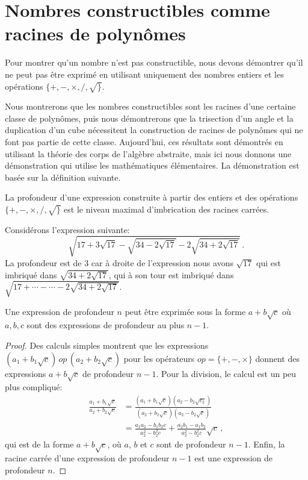 \section{Nombres constructibles comme racines de polynômes}\label{s.trisect-poly}
Pour montrer qu'un nombre n'est pas constructible, nous devons démontrer qu'il ne peut pas être exprimé en utilisant uniquement des nombres entiers et les opérations $\{+,-,\times,/,\surd\}$.

Nous montrerons que les nombres constructibles sont les racines d'une certaine classe de polynômes, puis nous démontrerons que la trisection d'un angle et la duplication d'un cube nécessitent la construction de racines de polynômes qui ne font pas partie de cette classe. Aujourd'hui, ces résultats sont démontrés en utilisant la théorie des corps de l'algèbre abstraite, mais ici nous donnons une démonstration qui utilise les mathématiques élémentaires. La démonstration est basée sur la définition suivante.

\begin{definition}
La profondeur d'une expression construite à partir des entiers et des opérations $\{+,-,\times,/,\surd\}$ est le niveau maximal d'imbrication des racines carrées.
\end{definition}

\begin{example}
Considérons l'expression suivante:
\[
\sqrt{17+3\sqrt{17} - \sqrt{34-2\sqrt{17}}
  -2\sqrt{34+2\sqrt{17}} }\,.
\]
La profondeur est de $3$ car à droite de l'expression nous avons $\sqrt{17}$ qui est imbriqué dans $\sqrt{34+2\sqrt{17}}$, qui à son tour est imbriqué dans  $\sqrt{17+\cdots-\cdots-2\sqrt{34+2\sqrt{17}}}$.
\end{example}

\begin{theorem}
Une expression de profondeur $n$ peut être exprimée sous la forme $a+b\sqrt{c}$ où $a,b,c$ sont des expressions de profondeur au plus $n-1$.
\end{theorem}
\begin{proof}
Des calculs simples montrent que les expressions $(a_1+b_1\sqrt{c})\,\mathit{op}\,(a_2+b_2\sqrt{c})$ pour les opérateurs $\mathit{op}=\{+,-,\times\}$ donnent des expressions $a+b\sqrt{c}$ de profondeur $n-1$. Pour la division, le calcul est un peu plus compliqué:
\begin{align*}
\frac{a_1+b_1\sqrt{c}}{a_2+b_2\sqrt{c}}&=
\frac{(a_1+b_1\sqrt{c})(a_2-b_2\sqrt{c_2})}{(a_2+b_2\sqrt{c})(a_2-b_2\sqrt{c})}\\
&=\frac{a_1a_2-b_1b_2c}{a_2^2-b_2^2c}+\frac{a_2b_1-a_1b_2}{a_2^2-b_2^2c}\sqrt{c}\,,
\end{align*}
qui est de la forme $a+b\sqrt{c}$, où $a$, $b$ et $c$ sont  de profondeur $n-1$.
Enfin, la racine carrée d'une expression de profondeur $n-1$ est une expression de profondeur $n$.
\end{proof}


